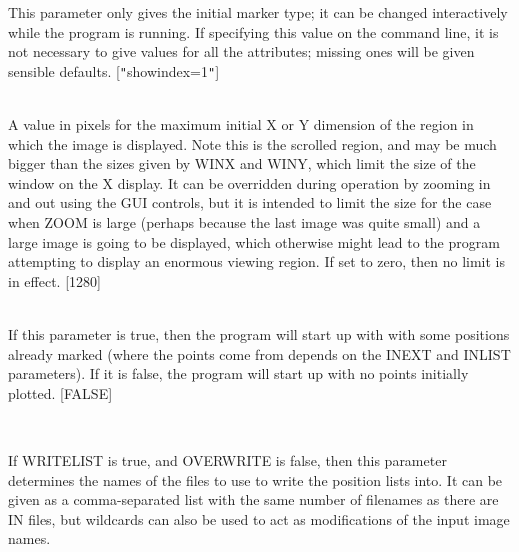 \documentclass[twoside,11pt]{article}
\renewcommand{\_}{\texttt{\symbol{95}}}
\newcommand{\sstsubsection}[1]{ \item[{#1}] \mbox{} \\}
\newcommand{\sstsubsection}[1]{\item[{#1}]}
\begin{document}
{{{{         }
         This parameter only gives the initial marker type; it can be
         changed interactively while the program is running.
         If specifying this value on the command line, it is not
         necessary to give values for all the attributes; missing ones
         will be given sensible defaults.
         [{\tt "}showindex=1{\tt "}]
      }
      \sstsubsection{
         MAXCANV = \_INTEGER (Read and Write)
      }{
         A value in pixels for the maximum initial X or Y dimension of
         the region in which the image is displayed.  Note this is the
         scrolled region, and may be much bigger than the sizes given
         by WINX and WINY, which limit the size of the window on the
         X display.  It can be overridden during operation by zooming
         in and out using the GUI controls, but it is intended to
         limit the size for the case when ZOOM is large (perhaps
         because the last image was quite small) and a large image
         is going to be displayed, which otherwise might lead to
         the program attempting to display an enormous viewing region.
         If set to zero, then no limit is in effect.
         [1280]
      }
      \sstsubsection{
         READLIST = \_LOGICAL (Read)
      }{
         If this parameter is true, then the program will start up
         with with some positions already marked (where the points
         come from depends on the INEXT and INLIST parameters).
         If it is  false, the program will start up with no points
         initially plotted.
         [FALSE]
      }
      \sstsubsection{
         OUTLIST = FILENAME (Write)
      }{
         If WRITELIST is true, and OVERWRITE is false, then this
         parameter determines the names of the files to use to write
         the position lists into.  It can be given as a comma-separated
         list with the same number of filenames as there are IN files,
         but wildcards can also be used to act as modifications of
         the input image names.

}}}
\end{document}

